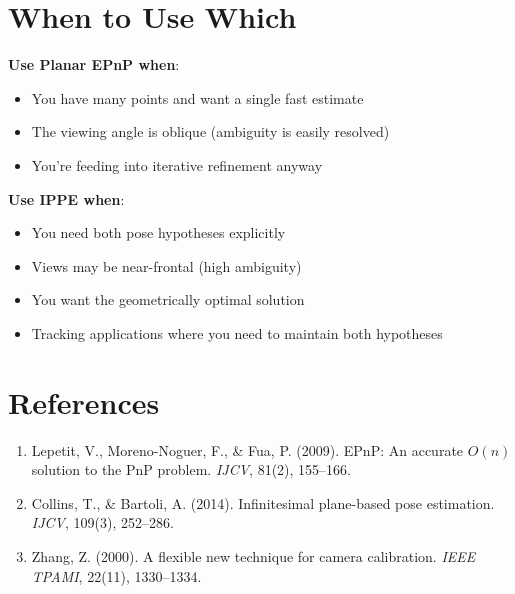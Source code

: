 \documentclass[11pt]{article}
\begin{document}
\section{When to Use Which}

\textbf{Use Planar EPnP when}:
\begin{itemize}
    \item You have many points and want a single fast estimate
    \item The viewing angle is oblique (ambiguity is easily resolved)
    \item You're feeding into iterative refinement anyway
\end{itemize}

\textbf{Use IPPE when}:
\begin{itemize}
    \item You need both pose hypotheses explicitly
    \item Views may be near-frontal (high ambiguity)
    \item You want the geometrically optimal solution
    \item Tracking applications where you need to maintain both hypotheses
\end{itemize}

\section*{References}

\begin{enumerate}
    \item Lepetit, V., Moreno-Noguer, F., \& Fua, P. (2009). EPnP: An accurate $O(n)$ solution to the PnP problem. \textit{IJCV}, 81(2), 155--166.

    \item Collins, T., \& Bartoli, A. (2014). Infinitesimal plane-based pose estimation. \textit{IJCV}, 109(3), 252--286.

    \item Zhang, Z. (2000). A flexible new technique for camera calibration. \textit{IEEE TPAMI}, 22(11), 1330--1334.
\end{enumerate}
\end{document}
